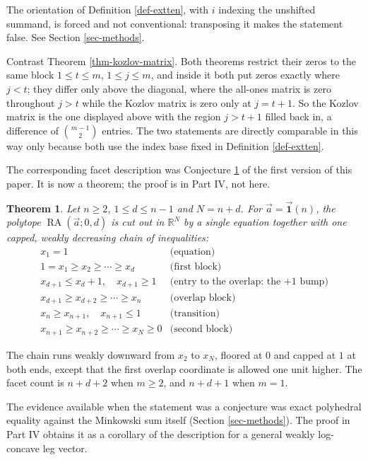 \documentclass[11pt, a4paper, abstract=yes]{scrartcl}
\theoremstyle{definition}
\theoremstyle{remark}
\theoremstyle{plain}
\newtheorem{theorem}[definition]{Theorem}
\newcommand{\RA}{\operatorname{RA}}
\newcommand{\onesvec}{\vec{\mathbf 1}}
\newcommand{\leanpartial}{\tikz[baseline=-0.6ex]{\fill[leanfull] (0,-0.6ex) arc (-90:90:0.6ex) -- cycle;\draw[leanfull,line width=0.5pt] (0,0) circle (0.6ex);}}
\newcommand{\compmark}{\tikz[baseline=-0.6ex]\fill[compmark] (-0.55ex,-0.55ex) rectangle (0.55ex,0.55ex);}
\newcommand{\leanmark}[1]{\leavevmode{\reversemarginpar\marginnote{\raggedleft#1}}}
\let\autocite\cite
\begin{document}
The orientation of Definition \ref{def-extten}, with \(i\) indexing the unshifted summand, is forced
and not conventional: transposing it makes the statement false. See Section \ref{sec-methods}.

Contrast Theorem \ref{thm-kozlov-matrix}. Both theorems restrict their zeros to the same block
\(1\le t\le m\), \(1\le j\le m\), and inside it both put zeros exactly where \(j<t\); they differ
only above the diagonal, where the all-ones matrix is zero throughout \(j>t\) while the Kozlov
matrix is zero only at \(j=t+1\). So the Kozlov matrix is the one displayed above with the region
\(j>t+1\) filled back in, a difference of \(\binom{m-1}{2}\) entries. The two statements are
directly comparable in this way only because both use the index base fixed in
Definition \ref{def-extten}.

The corresponding facet description was Conjecture \ref{conj:ones-hrep} of the first version of this
paper. It is now a theorem; the proof is in Part IV, not here.

\begin{theorem}
\leanmark{\leanpartial\,\compmark}\relax \autocite{SnellmanArticle4}
Let \(n\ge2\), \(1\le d\le n-1\) and \(N=n+d\). For \(\vec a=\onesvec(n)\), the
polytope \(\RA(\vec a;0,d)\)
is cut out in \(\mathbb R^N\) by a single equation together with one capped, weakly decreasing chain
of inequalities:
\[
\begin{array}{ll}
 x_1=1 & \text{(equation)}\\[2pt]
 1=x_1\ge x_2\ge\cdots\ge x_d & \text{(first block)}\\
 x_{d+1}\le x_d+1,\quad x_{d+1}\ge1 & \text{(entry to the overlap: the \(+1\) bump)}\\
 x_{d+1}\ge x_{d+2}\ge\cdots\ge x_n & \text{(overlap block)}\\
 x_n\ge x_{n+1},\quad x_{n+1}\le1 & \text{(transition)}\\
 x_{n+1}\ge x_{n+2}\ge\cdots\ge x_N\ge0 & \text{(second block)}
\end{array}
\]
\label{conj:ones-hrep}
\label{conj-ones-hrep}
\end{theorem}

The chain runs weakly downward from \(x_2\) to \(x_N\), floored at \(0\) and capped at \(1\) at both
ends, except that the first overlap coordinate is allowed one unit higher. The facet count is
\(n+d+2\) when \(m\ge2\), and \(n+d+1\) when \(m=1\).

The evidence available when the statement was a conjecture was exact polyhedral equality against
the Minkowski sum itself (Section \ref{sec-methods}). The proof in Part IV obtains it as a corollary
of the description for a general weakly log-concave leg vector.
\end{document}
